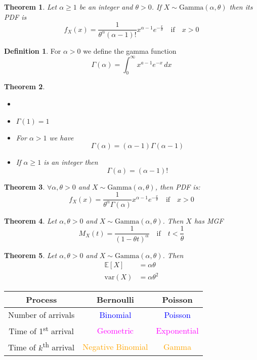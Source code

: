 \documentclass{article}
\newcommand{\E}{\mathbb{E}}
\newcommand{\var}{\text{var}}
\newcommand{\blue}{\textcolor{blue}}
\theoremstyle{plain}
\newtheorem{thm}{Theorem}[section]
\theoremstyle{definition}
\newtheorem{defn}{Definition}[section]
\theoremstyle{remark}
\begin{document}
\begin{thm}
    Let $\alpha\geq 1$ be an integer and $\theta>0$. If $X\sim\text{Gamma}(\alpha,\theta)$ then its PDF is \[f_X(x)=\frac{1}{\theta^\alpha(\alpha-1)!}x^{\alpha-1}e^{-\frac{x}{\theta}} \quad \text{if} \quad x>0\]
\end{thm}

\begin{defn}
    For $\alpha>0$ we define the gamma function \[\Gamma(\alpha)=\int_0^\infty x^{a-1}e^{-x}\,dx\]
\end{defn}

\begin{thm}
    \begin{itemize}
        \item []
        \item $\Gamma(1)=1$
        \item For $\alpha>1$ we have \[\Gamma(\alpha)=(\alpha-1)\Gamma(\alpha-1)\]
        \item If $\alpha\geq 1$ is an integer then \[\Gamma(a)=(\alpha-1)!\]
    \end{itemize}
\end{thm}

\begin{thm}
    $\forall \alpha, \theta > 0$ and $X\sim\text{Gamma}(\alpha,\theta)$, then PDF is: \[f_X(x)=\frac{1}{\theta^\alpha\Gamma(\alpha)}x^{\alpha-1}e^{-\frac{x}{\theta}} \quad \text{if} \quad x>0\]
\end{thm}

\begin{thm}
    Let $\alpha,\theta>0$ and $X\sim\text{Gamma}(\alpha,\theta)$. Then $X$ has MGF \[M_X(t)=\frac{1}{(1-\theta t)^\alpha} \quad \text{if} \quad t<\frac{1}{\theta}\]
\end{thm}

\begin{thm}
    Let $\alpha,\theta>0$ and $X\sim\text{Gamma}(\alpha,\theta)$. Then
    \begin{align*}
        \E[X]&=\alpha\theta \\
        \var(X)&=\alpha\theta^2
    \end{align*}
\end{thm}

\begingroup
\setlength{\tabcolsep}{8pt}
\renewcommand{\arraystretch}{1.5}
\begin{center}
\begin{tabular}{ c | c c }
    Process & Bernoulli & Poisson \\
    \hline
    Number of arrivals & \blue{Binomial} & \blue{Poisson} \\
    Time of 1\textsuperscript{st} arrival & \textcolor{magenta}{Geometric} & \textcolor{magenta}{Exponential} \\
    Time of $k$\textsuperscript{th} arrival & \textcolor{orange}{Negative Binomial} & \textcolor{orange}{Gamma}
\end{tabular}
\end{center}
\endgroup
\end{document}
